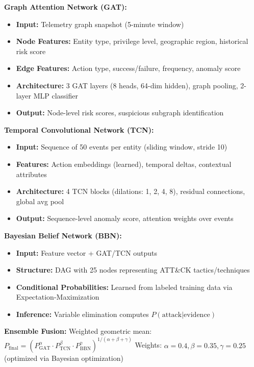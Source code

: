 \textbf{Graph Attention Network (GAT):}
\begin{itemize}
    \item \textbf{Input:} Telemetry graph snapshot (5-minute window)
    \item \textbf{Node Features:} Entity type, privilege level, geographic region, historical risk score
    \item \textbf{Edge Features:} Action type, success/failure, frequency, anomaly score
    \item \textbf{Architecture:} 3 GAT layers (8 heads, 64-dim hidden), graph pooling, 2-layer MLP classifier
    \item \textbf{Output:} Node-level risk scores, suspicious subgraph identification
\end{itemize}

\textbf{Temporal Convolutional Network (TCN):}
\begin{itemize}
    \item \textbf{Input:} Sequence of 50 events per entity (sliding window, stride 10)
    \item \textbf{Features:} Action embeddings (learned), temporal deltas, contextual attributes
    \item \textbf{Architecture:} 4 TCN blocks (dilations: 1, 2, 4, 8), residual connections, global avg pool
    \item \textbf{Output:} Sequence-level anomaly score, attention weights over events
\end{itemize}

\textbf{Bayesian Belief Network (BBN):}
\begin{itemize}
    \item \textbf{Input:} Feature vector + GAT/TCN outputs
    \item \textbf{Structure:} DAG with 25 nodes representing ATT\&CK tactics/techniques
    \item \textbf{Conditional Probabilities:} Learned from labeled training data via Expectation-Maximization
    \item \textbf{Inference:} Variable elimination computes $P(\text{attack} | \text{evidence})$
\end{itemize}

\textbf{Ensemble Fusion:}
Weighted geometric mean: $P_{\text{final}} = (P_{\text{GAT}}^{\alpha} \cdot P_{\text{TCN}}^{\beta} \cdot P_{\text{BBN}}^{\gamma})^{1/(\alpha+\beta+\gamma)}$
Weights: $\alpha=0.4, \beta=0.35, \gamma=0.25$ (optimized via Bayesian optimization)


